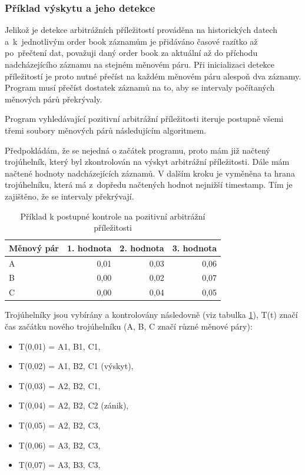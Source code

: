 \documentclass[thesis=B,czech]{FITthesis}[2019/03/21]
\begin{document}
\subsubsection{Příklad výskytu a jeho detekce}
Jelikož je detekce arbitrážních příležitostí prováděna na historických datech a~k~jednotlivým order book záznamům je přidáváno časové razítko až po~přečtení dat, považuji daný order book za aktuální až do příchodu nadcházejícího záznamu na stejném měnovém páru. Při inicializaci detekce příležitostí je proto nutné přečíst na každém měnovém páru alespoň dva záznamy. Program musí přečíst dostatek záznamů na to, aby se intervaly počítaných měnových párů překrývaly. 

Program vyhledávající pozitivní arbitrážní příležitosti iteruje postupně všemi třemi soubory měnových párů následujícím algoritmem. 

Předpokládám, že se nejedná o začátek programu, proto mám již načtený trojúhelník, který byl zkontrolován na výskyt arbitrážní příležitosti. Dále mám načtené hodnoty nadcházejících záznamů. V dalším kroku je vyměněna ta hrana trojúhelníku, která má z~dopředu načtených hodnot nejnižší timestamp. Tím je zajištěno, že se intervaly překrývají. 

\begin{table}\centering
\caption{Příklad k postupné kontrole na pozitivní arbitrážní příležitosti}
\label{timestamp_example}
\begin{tabular}{|| l | r | r | r ||}\hline Měnový pár & 1. hodnota & 2. hodnota & 3. hodnota\\ [0.5ex]
 \hline
 \hline A & 0,01 & 0,03 & 0,06\\ 
 \hline B & 0,00 & 0,02 & 0,07\\ 
 \hline C & 0,00 & 0,04 & 0,05\\ 
 \hline
\end{tabular}
\end{table}

Trojúhelníky jsou vybírány a kontrolovány následovně (viz tabulka \ref{timestamp_example}), T(t) značí čas začátku nového trojúhelníku (A, B, C značí různé měnové páry):
\begin{itemize}
    \item T(0,01) = A1, B1, C1,
    \item T(0,02) = A1, B2, C1 (výskyt),
    \item T(0,03) = A2, B2, C1,
    \item T(0,04) = A2, B2, C2 (zánik),
    \item T(0,05) = A2, B2, C3,
    \item T(0,06) = A3, B2, C3,
    \item T(0,07) = A3, B3, C3,
\end{itemize}
\end{document}
